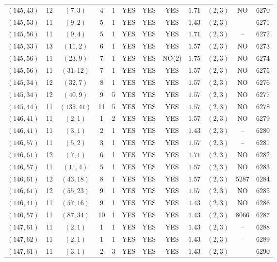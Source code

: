 \begin{longtable}{|c|c|c|c|c|c|c|c|c|c|c|c|}
$(145,43)$ & 12 & $(7,3)$ & 4 & 1 & YES & YES & YES & $1.71$ & $(2,3)$ & NO & 6270\\
$(145,53)$ & 11 & $(9,2)$ & 5 & 1 & YES & YES & YES & $1.43$ & $(2,3)$ & -- & 6271\\
$(145,56)$ & 11 & $(9,4)$ & 5 & 1 & YES & YES & YES & $1.71$ & $(2,3)$ & -- & 6272\\
$(145,33)$ & 13 & $(11,2)$ & 6 & 1 & YES & YES & YES & $1.57$ & $(2,3)$ & NO & 6273\\
$(145,56)$ & 11 & $(23,9)$ & 7 & 1 & YES & YES & NO(2) & $1.75$ & $(2,3)$ & NO & 6274\\
$(145,56)$ & 11 & $(31,12)$ & 7 & 1 & YES & YES & YES & $1.57$ & $(2,3)$ & NO & 6275\\
$(145,34)$ & 12 & $(32,7)$ & 8 & 1 & YES & YES & YES & $1.57$ & $(2,3)$ & NO & 6276\\
$(145,34)$ & 12 & $(40,9)$ & 9 & 5 & YES & YES & YES & $1.57$ & $(2,3)$ & NO & 6277\\
$(145,44)$ & 11 & $(135,41)$ & 11 & 5 & YES & YES & YES & $1.57$ & $(2,3)$ & NO & 6278\\
$(146,41)$ & 11 & $(2,1)$ & 1 & 2 & YES & YES & YES & $1.57$ & $(2,3)$ & NO & 6279\\
$(146,41)$ & 11 & $(3,1)$ & 2 & 1 & YES & YES & YES & $1.43$ & $(2,3)$ & -- & 6280\\
$(146,57)$ & 11 & $(5,2)$ & 3 & 1 & YES & YES & YES & $1.57$ & $(2,3)$ & -- & 6281\\
$(146,61)$ & 12 & $(7,1)$ & 6 & 1 & YES & YES & YES & $1.71$ & $(2,3)$ & NO & 6282\\
$(146,57)$ & 11 & $(11,4)$ & 5 & 1 & YES & YES & YES & $1.57$ & $(2,3)$ & NO & 6283\\
$(146,61)$ & 12 & $(43,18)$ & 8 & 1 & YES & YES & YES & $1.57$ & $(2,3)$ & 5287 & 6284\\
$(146,61)$ & 12 & $(55,23)$ & 9 & 1 & YES & YES & YES & $1.57$ & $(2,3)$ & NO & 6285\\
$(146,41)$ & 11 & $(57,16)$ & 9 & 1 & YES & YES & YES & $1.43$ & $(2,3)$ & NO & 6286\\
$(146,57)$ & 11 & $(87,34)$ & 10 & 1 & YES & YES & YES & $1.43$ & $(2,3)$ & 8066 & 6287\\
$(147,61)$ & 11 & $(2,1)$ & 1 & 1 & YES & YES & YES & $1.43$ & $(2,3)$ & -- & 6288\\
$(147,62)$ & 11 & $(2,1)$ & 1 & 1 & YES & YES & YES & $1.43$ & $(2,3)$ & -- & 6289\\
$(147,61)$ & 11 & $(3,1)$ & 2 & 3 & YES & YES & YES & $1.43$ & $(2,3)$ & -- & 6290\\

\end{longtable}

